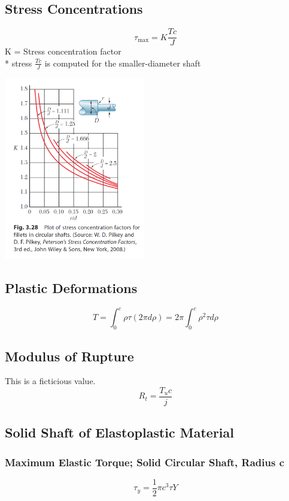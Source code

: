 \documentclass[10pt,landscape]{article}
\newenvironment{Figure}
     {\par\medskip\noindent\minipage{\linewidth}}
     {\endminipage\par\medskip}
\begin{document}
\begin{multicols}{3}
\subsection{Stress Concentrations}
\begin{equation}
    \tau_{\text{max}}=K\frac{Tc}{J}
\end{equation}
K = Stress concentration factor\\*
stress $\frac{Tc}{J}$ is computed for the smaller-diameter shaft
\begin{Figure}
    \centering
    \includegraphics[width=\linewidth, height=8cm]{PlotStressConcentrationsFilletsRoundShaft.png}
\end{Figure}
\subsection{Plastic Deformations}
\begin{equation}
    T=\int^c_0\rho\tau(2\pi d\rho)=2\pi\int^c_0\rho^2\tau d\rho
\end{equation}
\subsection{Modulus of Rupture}
This is a ficticious value.
\begin{equation}
    R_t=\frac{T_uc}{j}
\end{equation}
\subsection{Solid Shaft of Elastoplastic Material}
\subsubsection{Maximum Elastic Torque; Solid Circular Shaft, Radius c}
\begin{equation}
    \tau_y=\frac{1}{2}\pi c^3\tau Y
\end{equation}

\end{multicols}
\end{document}
